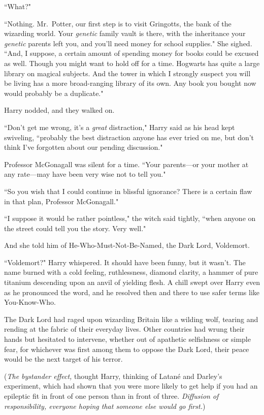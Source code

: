 ``What?"

``Nothing. Mr.~Potter, our first step is to visit Gringotts, the bank of the wizarding world. Your \emph{genetic} family vault is there, with the inheritance your \emph{genetic} parents left you, and you'll need money for school supplies." She sighed. ``And, I suppose, a certain amount of spending money for books could be excused as well. Though you might want to hold off for a time. Hogwarts has quite a large library on magical subjects. And the tower in which I strongly suspect you will be living has a more broad-ranging library of its own. Any book you bought now would probably be a duplicate."

Harry nodded, and they walked on.

``Don't get me wrong, it's a \emph{great} distraction," Harry said as his head kept swiveling, ``probably the best distraction anyone has ever tried on me, but don't think I've forgotten about our pending discussion."

Professor McGonagall was silent for a time. ``Your parents---or your mother at any rate---may have been very wise not to tell you."

``So you wish that I could continue in blissful ignorance? There is a certain flaw in that plan, Professor McGonagall."

``I suppose it would be rather pointless," the witch said tightly, ``when anyone on the street could tell you the story. Very well."

And she told him of He-Who-Must-Not-Be-Named, the Dark Lord, Voldemort.

``Voldemort?" Harry whispered. It should have been funny, but it wasn't. The name burned with a cold feeling, ruthlessness, diamond clarity, a hammer of pure titanium descending upon an anvil of yielding flesh. A chill swept over Harry even as he pronounced the word, and he resolved then and there to use safer terms like You-Know-Who.

The Dark Lord had raged upon wizarding Britain like a wilding wolf, tearing and rending at the fabric of their everyday lives. Other countries had wrung their hands but hesitated to intervene, whether out of apathetic selfishness or simple fear, for whichever was first among them to oppose the Dark Lord, their peace would be the next target of his terror.

(\emph{The bystander effect,} thought Harry, thinking of Latané and Darley's experiment, which had shown that you were more likely to get help if you had an epileptic fit in front of one person than in front of three. \emph{Diffusion of responsibility, everyone hoping that someone else would go first.})

